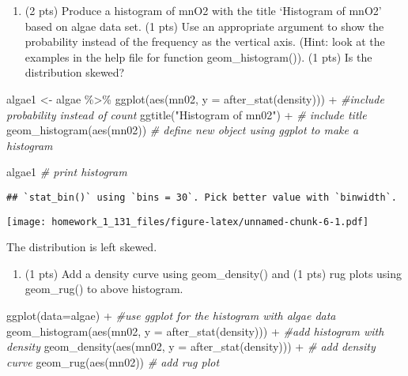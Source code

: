 \documentclass[
]{article}
\newenvironment{Shaded}{\begin{snugshade}}{\end{snugshade}}
\newcommand{\AttributeTok}[1]{\textcolor[rgb]{0.77,0.63,0.00}{#1}}
\newcommand{\CommentTok}[1]{\textcolor[rgb]{0.56,0.35,0.01}{\textit{#1}}}
\newcommand{\FunctionTok}[1]{\textcolor[rgb]{0.00,0.00,0.00}{#1}}
\newcommand{\NormalTok}[1]{#1}
\newcommand{\OtherTok}[1]{\textcolor[rgb]{0.56,0.35,0.01}{#1}}
\newcommand{\SpecialCharTok}[1]{\textcolor[rgb]{0.00,0.00,0.00}{#1}}
\newcommand{\StringTok}[1]{\textcolor[rgb]{0.31,0.60,0.02}{#1}}
\providecommand{\tightlist}{%
  \setlength{\itemsep}{0pt}\setlength{\parskip}{0pt}}
\begin{document}
\begin{enumerate}
\def\labelenumi{\alph{enumi}.}
\tightlist
\item
  (2 pts) Produce a histogram of mnO2 with the title `Histogram of mnO2'
  based on algae data set. (1 pts) Use an appropriate argument to show
  the probability instead of the frequency as the vertical axis. (Hint:
  look at the examples in the help file for function geom\_histogram()).
  (1 pts) Is the distribution skewed?
\end{enumerate}

\begin{Shaded}
\begin{Highlighting}[]
\NormalTok{algae1 }\OtherTok{\textless{}{-}}\NormalTok{ algae }\SpecialCharTok{\%\textgreater{}\%}
  \FunctionTok{ggplot}\NormalTok{(}\FunctionTok{aes}\NormalTok{(mn02, }\AttributeTok{y =} \FunctionTok{after\_stat}\NormalTok{(density))) }\SpecialCharTok{+}  \CommentTok{\#include probability instead of count}
  \FunctionTok{ggtitle}\NormalTok{(}\StringTok{"Histogram of mn02"}\NormalTok{) }\SpecialCharTok{+} \CommentTok{\# include title}
  \FunctionTok{geom\_histogram}\NormalTok{(}\FunctionTok{aes}\NormalTok{(mn02)) }\CommentTok{\# define new object using ggplot to make a histogram}


\NormalTok{algae1 }\CommentTok{\# print histogram}
\end{Highlighting}
\end{Shaded}

\begin{verbatim}
## `stat_bin()` using `bins = 30`. Pick better value with `binwidth`.
\end{verbatim}

\texttt{[image: homework\_1\_131\_files/figure-latex/unnamed-chunk-6-1.pdf]}

The distribution is left skewed.

\begin{enumerate}
\def\labelenumi{\alph{enumi}.}
\setcounter{enumi}{1}
\tightlist
\item
  (1 pts) Add a density curve using geom\_density() and (1 pts) rug
  plots using geom\_rug() to above histogram.
\end{enumerate}

\begin{Shaded}
\begin{Highlighting}[]
\FunctionTok{ggplot}\NormalTok{(}\AttributeTok{data=}\NormalTok{algae) }\SpecialCharTok{+}  \CommentTok{\#use ggplot for the histogram with algae data}
\FunctionTok{geom\_histogram}\NormalTok{(}\FunctionTok{aes}\NormalTok{(mn02, }\AttributeTok{y =} \FunctionTok{after\_stat}\NormalTok{(density))) }\SpecialCharTok{+} \CommentTok{\#add histogram with density}
\FunctionTok{geom\_density}\NormalTok{(}\FunctionTok{aes}\NormalTok{(mn02, }\AttributeTok{y =} \FunctionTok{after\_stat}\NormalTok{(density))) }\SpecialCharTok{+} \CommentTok{\# add density curve}
\FunctionTok{geom\_rug}\NormalTok{(}\FunctionTok{aes}\NormalTok{(mn02)) }\CommentTok{\# add rug plot}
\end{Highlighting}
\end{Shaded}
\end{document}
